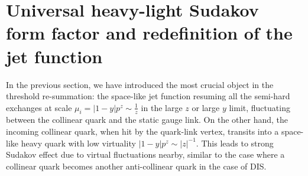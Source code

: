 \documentclass[a4paper,11pt]{article}
\begin{document}
\section{Universal heavy-light Sudakov form factor and redefinition of the jet function}\label{sec:suda}


In the previous section, we have introduced the most crucial object in the threshold re-summation: the space-like jet function resuming all the semi-hard exchanges at scale $\mu_i=|1-y|p^z\sim \frac{1}{z}$ in the large $z$ or large $y$ limit, fluctuating between the collinear quark and the static gauge link.  On the other hand, the incoming collinear quark, when hit by the quark-link vertex, transits into a space-like heavy quark with low virtuality $|1-y|p^z \sim |z|^{-1}$.  This leads to strong Sudakov effect due to virtual fluctuations nearby, similar to the case where a collinear quark becomes another anti-collinear quark in the case of DIS.  
\end{document}
